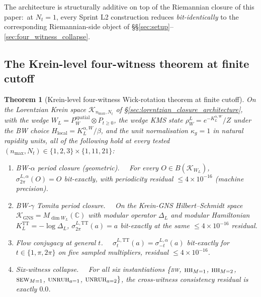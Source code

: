 \documentclass[11pt,a4paper]{article}
\theoremstyle{plain}
\newtheorem{theorem}{Theorem}[section]
\theoremstyle{definition}
\newcommand{\nmax}{n_{\max}}
\begin{document}
The architecture is structurally additive on top of the Riemannian
closure of this paper:\ at $N_t = 1$, every Sprint L2 construction
reduces \emph{bit-identically} to the corresponding Riemannian-side
object of \S\S\ref{sec:setup}--\ref{sec:four_witness_collapse}.

\subsection{The Krein-level four-witness theorem at finite cutoff}
\label{sec:krein_four_witness_theorem}

\begin{theorem}[Krein-level four-witness Wick-rotation theorem at finite cutoff]
\label{thm:krein_four_witness}
On the Lorentzian Krein space $\mathcal{K}_{\nmax, N_t}$ of
\S\ref{sec:lorentzian_closure_architecture}, with the wedge
$W_L = P_W^{\mathrm{spatial}} \otimes P_{t \geq 0}$, the wedge
KMS state $\rho_W^L = e^{-K_L^{\alpha, W}}/Z$ under the BW choice
$H_{\mathrm{local}} = K_L^{\alpha, W}/\beta$, and the unit
normalisation $\kappa_g = 1$ in natural rapidity units, all of the
following hold at every tested $(\nmax, N_t) \in \{1, 2, 3\} \times \{1, 11, 21\}$:
\begin{enumerate}\setlength{\itemsep}{2pt}
\item[(a)] \emph{BW-$\alpha$ period closure (geometric).}\ \ %
For every $O \in B(\mathcal{K}_{W_L})$,
$\sigma_{2\pi}^{L, \alpha}(O) = O$ bit-exactly, with periodicity residual
$\le 4 \times 10^{-16}$ (machine precision).
\item[(b)] \emph{BW-$\gamma$ Tomita period closure.}\ \ %
On the Krein-GNS Hilbert--Schmidt space
$\mathcal{K}_{\mathrm{GNS}} = M_{\dim W_L}(\mathbb{C})$ with modular
operator $\Delta_L$ and modular Hamiltonian $K_L^{\mathrm{TT}} = -\log \Delta_L$,
$\sigma_{2\pi}^{L, \mathrm{TT}}(a) = a$ bit-exactly at the same
$\le 4 \times 10^{-16}$ residual.
\item[(c)] \emph{Flow conjugacy at general $t$.}\ \ %
$\sigma_t^{L, \mathrm{TT}}(a) = \sigma_{-t}^{L, \alpha}(a)$ bit-exactly
for $t \in \{1, \pi, 2\pi\}$ on five sampled multipliers, residual
$\le 4 \times 10^{-16}$.
\item[(d)] \emph{Six-witness collapse.}\ \ %
For all six instantiations \{\textsc{bw}, $\textsc{hh}_{M=1}$,
$\textsc{hh}_{M=2}$, $\textsc{sew}_{M=1}$, $\textsc{unruh}_{a=1}$,
$\textsc{unruh}_{a=2}\}$, the cross-witness consistency residual is
exactly $0.0$.
\end{enumerate}
\end{theorem}
\end{document}
